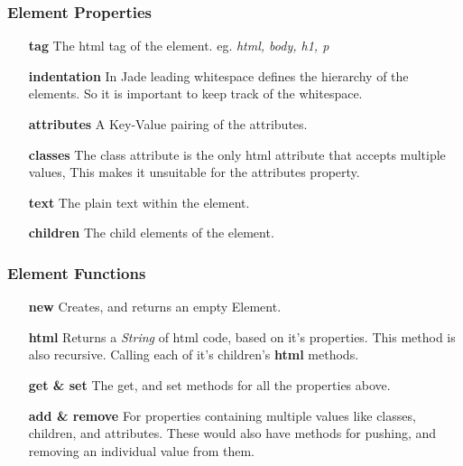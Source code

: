 \subsubsection{Element Properties}
\begin{itemize}
    \item[\textbf{tag}] The html tag of the element. eg. \textit{html, body, h1, p}
    \item[\textbf{indentation}] In Jade leading whitespace defines the hierarchy of the elements. So it is important to keep track of the whitespace.
    \item[\textbf{attributes}] A Key-Value pairing of the attributes.
    \item[\textbf{classes}] The class attribute is the only html attribute that accepts multiple values, This makes it unsuitable for the attributes property.
    \item[\textbf{text}] The plain text within the element.
    \item[\textbf{children}] The child elements of the element.
\end{itemize}
\subsubsection{Element Functions}
\begin{itemize}
    \item[\textbf{new}] Creates, and returns an empty Element.
    \item[\textbf{html}] Returns a \textit{String} of html code, based on it's properties. This method is also recursive. Calling each of it's children's \textbf{html} methods.
    \item[\textbf{get \& set}] The get, and set methods for all the properties above.
    \item[\textbf{add \& remove}] For properties containing multiple values like classes, children, and attributes. These would also have methods for pushing, and removing an individual value from them.
\end{itemize}


